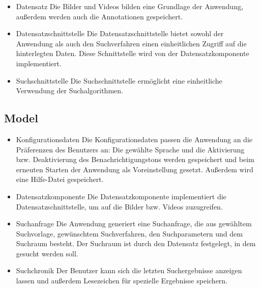 \begin{itemize}
\item Datensatz\newline
Die Bilder und Videos bilden eine Grundlage der Anwendung, außerdem werden auch die Annotationen gespeichert.
\item Datensatzschnittstelle\newline
Die Datensatzschnittstelle bietet sowohl der Anwendung als auch den Suchverfahren einen einheitlichen Zugriff auf die hinterlegten Daten. Diese Schnittstelle wird von der Datensatzkomponente implementiert.
\item Suchschnittstelle\newline
Die Suchschnittstelle ermöglicht eine einheitliche Verwendung der Suchalgorithmen.
\end{itemize}

\subsection{Model}
\begin{itemize}
\item Konfigurationsdaten\newline
Die Konfigurationsdaten passen die Anwendung an die Präferenzen des Benutzers an: Die gewählte Sprache und die Aktivierung bzw. Deaktivierung des Benachrichtigungstons werden gespeichert und beim erneuten Starten der Anwendung als Voreinstellung gesetzt. Außerdem wird eine Hilfe-Datei gespeichert.
\item Datensatzkomponente\newline
Die Datensatzkomponente implementiert die Datensatzschnittstelle, um auf die Bilder bzw. Videos zuzugreifen.
\item Suchanfrage\newline
Die Anwendung generiert eine Suchanfrage, die aus gewähltem Suchvorlage, gewünschtem Suchverfahren, den Suchparametern und dem Suchraum besteht. Der Suchraum ist durch den Datensatz festgelegt, in dem gesucht werden soll.
\item Suchchronik\newline
Der Benutzer kann sich die letzten Suchergebnisse anzeigen lassen und außerdem Lesezeichen für spezielle Ergebnisse speichern.
\end{itemize}

